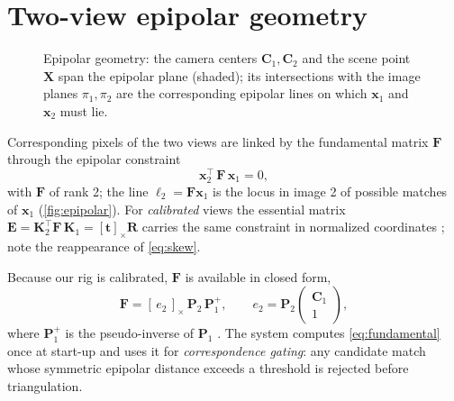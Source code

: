 \documentclass[11pt]{article}
\theoremstyle{definition}
\newcommand{\mat}[1]{\mathbf{#1}}
\newcommand{\vect}[1]{\mathbf{#1}}
\newcommand{\R}{\mat{R}}
\newcommand{\K}{\mat{K}}
\newcommand{\F}{\mat{F}}
\newcommand{\E}{\mat{E}}
\newcommand{\PP}{\mat{P}}
\newcommand{\X}{\vect{X}}
\newcommand{\x}{\vect{x}}
\newcommand{\tv}{\vect{t}}
\newcommand{\Cv}{\vect{C}}
\begin{document}
\section{Two-view epipolar geometry}
\label{sec:epipolar}

\begin{figure}[ht]
\centering
{}
\caption{Epipolar geometry: the camera centers $\Cv_1,\Cv_2$ and the scene
point $\X$ span the epipolar plane (shaded); its intersections with the image
planes $\pi_1,\pi_2$ are the corresponding epipolar lines on which $\x_1$ and
$\x_2$ must lie.}
\label{fig:epipolar}
\end{figure}

Corresponding pixels of the two views are linked by the fundamental matrix
$\F$ through the epipolar constraint
\begin{equation}
\x_2^{\!\top}\,\F\,\x_1 = 0,
\label{eq:epiconstraint}
\end{equation}
with $\F$ of rank 2; the line $\boldsymbol{\ell}_2 = \F\x_1$ is the locus in
image 2 of possible matches of $\x_1$ (\autoref{fig:epipolar}). For
\emph{calibrated} views the essential matrix
$\E = \K_2^{\!\top}\F\,\K_1 = [\tv]_\times\R$ carries the same constraint in
normalized coordinates \cite{LonguetHiggins1981}; note the reappearance of
\eqref{eq:skew}.

Because our rig is calibrated, $\F$ is available in closed form,
\begin{equation}
\F = [\,e_2\,]_\times\, \PP_2\, \PP_1^{+},
\qquad e_2 = \PP_2\begin{pmatrix}\Cv_1\\1\end{pmatrix},
\label{eq:fundamental}
\end{equation}
where $\PP_1^{+}$ is the pseudo-inverse of $\PP_1$
\cite{HartleyZisserman2004}. The system computes \eqref{eq:fundamental} once
at start-up and uses it for \emph{correspondence gating}: any candidate match
whose symmetric epipolar distance exceeds a threshold is rejected before
triangulation.
\end{document}
